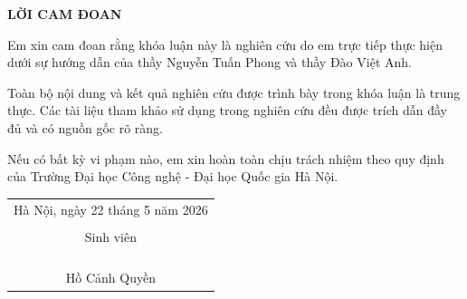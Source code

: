 \thispagestyle{empty}
\begin{center}
\fontsize{13pt}{1pt}\selectfont
    \textbf{LỜI CAM ĐOAN}
\end{center}

\fontsize{13pt}{1pt}\selectfont
\vspace{1cm}
Em xin cam đoan rằng khóa luận này là nghiên cứu do em trực tiếp thực hiện dưới sự hướng dẫn của thầy Nguyễn Tuấn Phong và thầy Đào Việt Anh.

Toàn bộ nội dung và kết quả nghiên cứu được trình bày trong khóa luận là trung
thực. Các tài liệu tham khảo sử dụng trong nghiên cứu đều được trích dẫn đầy đủ và có
nguồn gốc rõ ràng.

Nếu có bất kỳ vi phạm nào, em xin hoàn toàn chịu trách nhiệm theo quy định của
Trường Đại học Công nghệ - Đại học Quốc gia Hà Nội.


\begin{table}[h!]
\raggedleft
  \begin{tabular}{c}
     \fontsize{13pt}{1pt}\selectfont
    Hà Nội, ngày 22 tháng 5 năm 2026    \\
    \\
     \fontsize{13pt}{1pt}\selectfont
    Sinh viên
    \\
    
    \\

    \\

    \\
    
    \\
    
     \fontsize{13pt}{1pt}\selectfont
    Hồ Cảnh Quyền
    
  \end{tabular}
\end{table}
